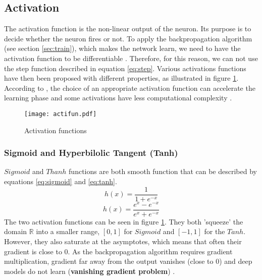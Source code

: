 \subsection{Activation} \label{subs:acti}
The activation function is the non-linear output of the neuron. Its purpose is to decide whether the neuron fires or not. To apply the backpropagation algorithm (see section \ref{sec:train}), which makes the network learn, we need to have the activation function to be differentiable \cite{lecun_backpropagation_1989}. Therefore, for this reason, we can not use the step function described in equation \eqref{eq:step}. Various activations functions have then been proposed with different properties, as illustrated in figure \ref{fig:acti}. According to \textcite{khan_survey_2020}, the choice of an appropriate activation function can accelerate the learning phase and some activations have less computational complexity \cite{krizhevsky_imagenet_2012}.
%
\begin{figure}
    \centering
    \texttt{[image: actifun.pdf]}
    \caption{Activation functions}
    \label{fig:acti}
\end{figure}
%
\subsubsection{Sigmoid and Hyperbilolic Tangent (Tanh)}
$Sigmoid$ and $Thanh$ functions are both smooth function that can be described by equations \eqref{eq:sigmoid} and \eqref{eq:tanh}.
%
\begin{equation}
    h(x) = \frac{1}{1 + e^{-x}}
    \label{eq:sigmoid}
\end{equation}
%
\begin{equation}
    h(x) = \frac{e^{x} - e^{-x}}{e^{x} + e^{-x}}
    \label{eq:tanh}
\end{equation}
%
The two activation functions can be seen in figure \ref{fig:acti}. They both 'squeeze' the domain $\mathbb{R}$ into a smaller range, $[0, 1]$ for $Sigmoid$ and $[-1, 1]$ for the $Tanh$. However, they also saturate at the asymptotes, which means that often their gradient is close to 0. As the backpropagation algorithm requires gradient multiplication, gradient far away from the output vanishes (close to 0) and deep models do not learn (\textbf{vanishing gradient problem}) \cite{goodfellow_deep_2016}.
%
